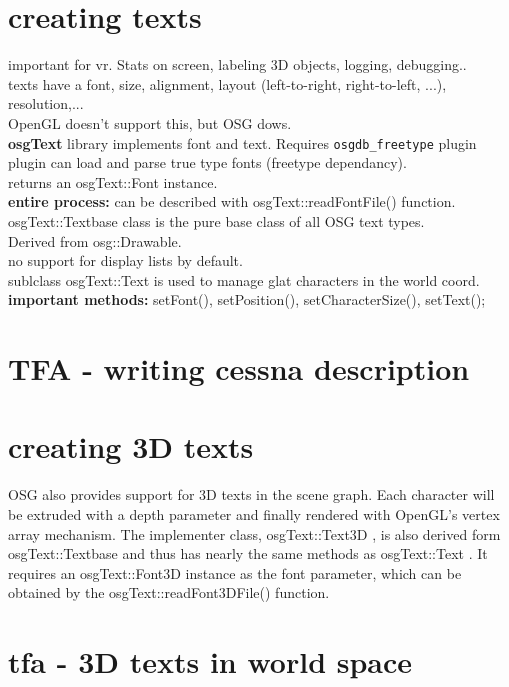 \documentclass[a4paper,12pt]{book}
\begin{document}
\section{creating texts}
important for vr. Stats on screen, labeling 3D objects, logging, debugging..\\
texts have a font, size, alignment, layout (left-to-right, right-to-left, ...), resolution,...\\
OpenGL doesn't support this, but OSG dows.\\
\textbf{osgText} library implements font and text. Requires \verb|osgdb_freetype| plugin\\
\textrightarrow plugin can load and parse true type fonts (freetype dependancy).\\
\textrightarrow returns an osgText::Font instance. \\
\textbf{entire process:} can be described with osgText::readFontFile() function.\\
osgText::Textbase class is the pure base class of all OSG text types.\\
Derived from osg::Drawable.\\
no support for display lists by default.\\
sublclass osgText::Text is used to manage glat characters in the world coord.\\
\textbf{important methods:} setFont(), setPosition(), setCharacterSize(), setText();\\

\section{TFA - writing cessna description}

\section{creating 3D texts}
OSG also provides support for 3D texts in the scene graph. Each character
will be extruded with a depth parameter and finally rendered with OpenGL's vertex
array mechanism. The implementer class, osgText::Text3D , is also derived form
osgText::Textbase and thus has nearly the same methods as osgText::Text . It
requires an osgText::Font3D instance as the font parameter, which can be obtained by
the osgText::readFont3DFile() function.

\section{tfa - 3D texts in world space}
\end{document}

